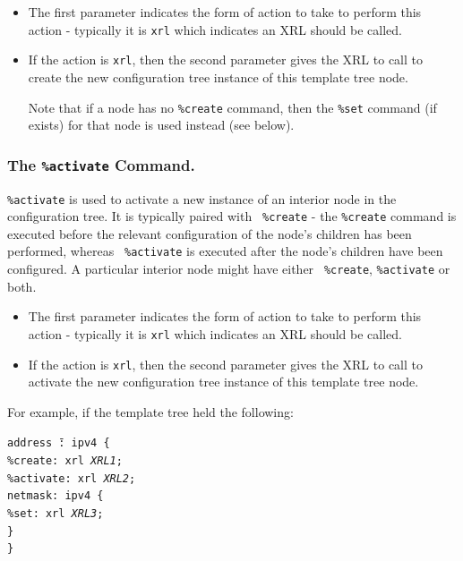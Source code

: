 \documentclass[11pt]{article}
\begin{document}
\begin{itemize}

  \item The first parameter indicates the form of
action to take to perform this action - typically it is {\tt xrl}
which indicates an XRL should be called.

  \item If the action is {\tt xrl}, then the second parameter gives the XRL to
call to create the new configuration tree instance of this template
tree node.

Note that if a node has no {\tt \%create} command, then the {\tt \%set}
command (if exists) for that node is used instead (see below).

\end{itemize}

\subsubsection{The {\tt \%activate} Command.}
{\tt \%activate} is used to activate a new instance of an interior
node in the configuration tree.  It is typically paired with {\tt
\%create} - the {\tt \%create} command is executed before the relevant
configuration of the node's children has been performed, whereas {\tt
\%activate} is executed after the node's children have been
configured.  A particular interior node might have either {\tt
\%create}, {\tt \%activate} or both.

\begin{itemize}

  \item The first parameter indicates the form of action to take to perform
this action - typically it is {\tt xrl} which indicates an XRL should
be called.

  \item If the action is {\tt xrl}, then the second parameter gives the XRL to
call to activate the new configuration tree instance of this template
tree node.

\end{itemize}

For example, if the template tree held the following:

\begin{tabbing}
\tt addr\=\tt ess \=\tt@: ipv4 \{\\
    \>\tt\%create: xrl {\it XRL1};\\
    \>\tt\%activate: xrl {\it XRL2};\\
    \>\tt netmask: ipv4 \{\\
        \>\>\tt\%set: xrl {\it XRL3};\\
    \>\tt\}\\
\tt\}
\end{tabbing}
\end{document}
